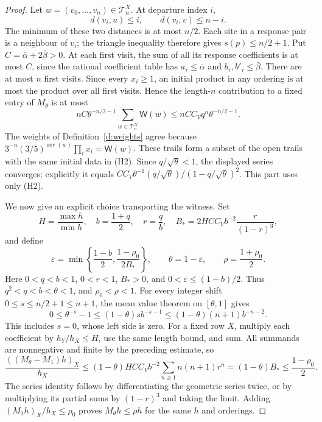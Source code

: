 \begin{proof}
Let \(w=(v_0,\ldots,v_n)\in\mathcal T_n^X\).  At departure
index \(i\),
\[
 d(v_i,u)\le i,\qquad d(v_i,v)\le n-i.
\]
The minimum of these two distances is at most \(n/2\).  Each
site in a response pair is a neighbour of \(v_i\); the triangle
inequality therefore gives \(s(p)\le n/2+1\).
Put \(C=\bar\alpha+2\bar\beta>0\).  At each first visit, the
sum of all its response coefficients is at most \(C\), since
the rational coefficient table has \(a_\tau\le\bar\alpha\) and
\(b_\tau,b'_\tau\le\bar\beta\).  There are at most \(n\) first
visits.  Since every \(x_i\ge1\), an initial product in any
ordering is at most the product over all first visits.  Hence
the length-\(n\) contribution to a fixed entry of \(M_\theta\)
is at most
\[
 nC\theta^{-n/2-1}
       \sum_{w\in\mathcal T_n^X}\mathsf W(w)
       \le nCC_Vq^n\theta^{-n/2-1}.
\]
The weights of Definition~\ref{d:weights} agree because
\(3^{-n}(3/5)^{\operatorname{rev}(w)}\prod_i x_i
 =\mathsf W(w)\).  These trails form a subset of the open trails
with the same initial data in (H2).  Since
\(q/\sqrt\theta<1\), the displayed series converges; explicitly
it equals
\(CC_V\theta^{-1}(q/\sqrt\theta)/(1-q/\sqrt\theta)^2\).
This part uses only (H2).

We now give an explicit choice transporting the witness.  Set
\[
 H=\frac{\max h}{\min h},\quad
 b=\frac{1+q}{2},\quad r=\frac qb,\quad
 B_*=2HCC_Vb^{-2}\frac{r}{(1-r)^3},
\]
and define
\begin{equation}\label{e:rec-shift-choice}
 \varepsilon=\min\left\{\frac{1-b}{2},
                         \frac{1-\rho_0}{2B_*}\right\},
 \qquad \theta=1-\varepsilon,\qquad
 \rho=\frac{1+\rho_0}{2}.
\end{equation}
Here \(0<q<b<1\), \(0<r<1\), \(B_*>0\), and
\(0<\varepsilon\le(1-b)/2\).  Thus
\(q^2<q<b<\theta<1\), and \(\rho_0<\rho<1\).
For every integer shift \(0\le s\le n/2+1\le n+1\),
the mean value theorem on \([\theta,1]\) gives
\[
 0\le\theta^{-s}-1
     \le(1-\theta)s b^{-s-1}
     \le(1-\theta)(n+1)b^{-n-2}.
\]
This includes \(s=0\), whose left side is zero.
For a fixed row \(X\), multiply each coefficient by
\(h_Y/h_X\le H\), use the same length bound, and sum.  All
summands are nonnegative and finite by the preceding estimate, so
\[
 \frac{((M_\theta-M_1)h)_X}{h_X}
 \le (1-\theta)HCC_Vb^{-2}
                  \sum_{n\ge1}n(n+1)r^n
 = (1-\theta)B_*\le\frac{1-\rho_0}{2}.
\]
The series identity follows by differentiating the geometric series
twice, or by multiplying its partial sums by \((1-r)^3\) and
taking the limit.  Adding \((M_1h)_X/h_X\le\rho_0\) proves
\(M_\theta h\le\rho h\) for the same \(h\) and orderings.
\end{proof}

